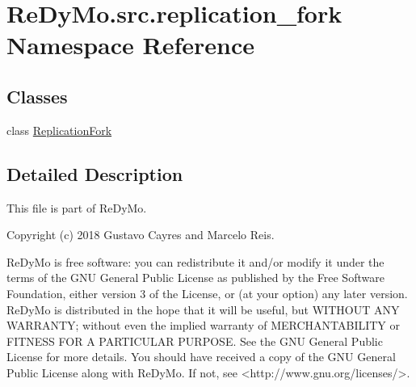 \hypertarget{namespaceReDyMo_1_1src_1_1replication__fork}{}\section{Re\+Dy\+Mo.\+src.\+replication\+\_\+fork Namespace Reference}
\label{namespaceReDyMo_1_1src_1_1replication__fork}
\subsection*{Classes}
\begin{DoxyCompactItemize}
\item 
class \mbox{\hyperlink{classReDyMo_1_1src_1_1replication__fork_1_1ReplicationFork}{Replication\+Fork}}
\end{DoxyCompactItemize}


\subsection{Detailed Description}
\begin{DoxyVerb}This file is part of ReDyMo.

  Copyright (c) 2018  Gustavo Cayres and Marcelo Reis.

  ReDyMo is free software: you can redistribute it and/or modify it
  under the terms of the GNU General Public License as published by the
  Free Software Foundation, either version 3 of the License, or (at your
  option) any later version.
  ReDyMo is distributed in the hope that it will be useful, but WITHOUT
  ANY WARRANTY; without even the implied warranty of MERCHANTABILITY or
  FITNESS FOR A PARTICULAR PURPOSE. See the GNU General Public License
  for more details.
  You should have received a copy of the GNU General Public License along
  with ReDyMo. If not, see <http://www.gnu.org/licenses/>.
\end{DoxyVerb}
 